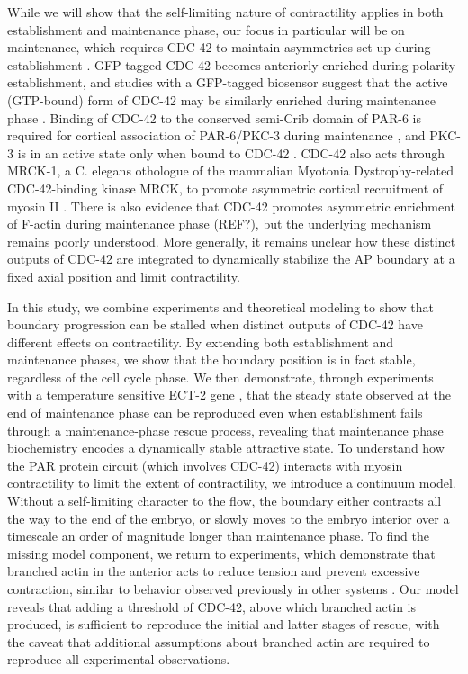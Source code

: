 \documentclass[11pt]{article}
\newcommand{\6}[1]{#1_{\text{6}}}
\newcommand{\3}[1]{#1_{\text{3}}}
\begin{document}
While we will show that the self-limiting nature of contractility applies in both establishment and maintenance phase, our focus in particular will be on maintenance, which requires CDC-42 to maintain asymmetries set up during establishment \citep{kay2001cdc, gotta2001cdc,aceto2006interaction, schonegg2006cdc, motegi2006sequential}. GFP-tagged CDC-42 becomes anteriorly enriched during polarity establishment, and studies with a GFP-tagged biosensor suggest that the active (GTP-bound) form of CDC-42 may be similarly enriched during maintenance phase \citep{kumfer2010cgef}.  Binding of CDC-42 to the conserved semi-Crib domain of PAR-6 is required for cortical association of PAR-6/PKC-3 during maintenance \citep{aceto2006interaction}, and PKC-3 is in an active state only when bound to CDC-42 \citep{sailer2015dynamic,lang2017proteins,rodriguez2017apkc}. CDC-42 also acts through MRCK-1, a C. elegans othologue of the mammalian Myotonia Dystrophy-related CDC-42-binding kinase MRCK, to promote asymmetric cortical recruitment of myosin II \citep{kumfer2010cgef}.  There is also evidence that CDC-42 promotes asymmetric enrichment of F-actin during maintenance phase (REF?), but the underlying mechanism remains poorly understood.  More generally, it remains unclear how these distinct outputs of CDC-42 are integrated to dynamically stabilize the AP boundary at a fixed axial position and limit contractility. 

In this study, we combine experiments and theoretical modeling to show that boundary progression can be stalled when distinct outputs of CDC-42 have different effects on contractility. By extending both establishment and maintenance phases, we show that the boundary position is in fact stable, regardless of the cell cycle phase. We then demonstrate, through experiments with a temperature sensitive ECT-2 gene \citep{zonies2010symmetry}, that the steady state observed at the end of maintenance phase can be reproduced even when establishment fails through a maintenance-phase rescue process, revealing that maintenance phase biochemistry encodes a dynamically stable attractive state. To understand how the PAR protein circuit (which involves CDC-42) interacts with myosin contractility to limit the extent of contractility, we introduce a continuum model. Without a self-limiting character to the flow, the boundary either contracts all the way to the end of the embryo, or slowly moves to the embryo interior over a timescale an order of magnitude longer than maintenance phase. To find the missing model component, we return to experiments, which demonstrate that branched actin in the anterior acts to reduce tension and prevent excessive contraction, similar to behavior observed previously in other systems \citep{muresan2022f, yang2012arp2}. Our model reveals that adding a threshold of CDC-42, above which branched actin is produced, is sufficient to reproduce the initial and latter stages of rescue, with the caveat that additional assumptions about branched actin are required to reproduce all experimental observations.
\end{document}
